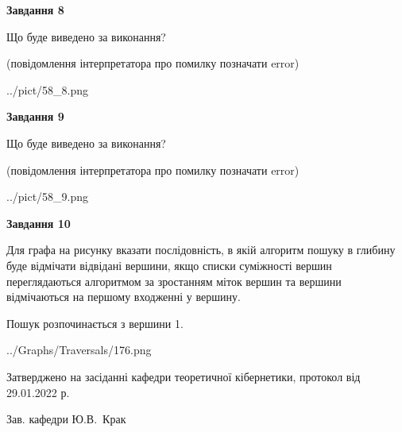 \documentclass[12pt, ukrainian]{article}
\begin{document}
{\begin {large}
{\begin {center}\textbf{Завдання 8}\end {center}}\par
Що буде виведено за виконання?\par
 (повідомлення інтерпретатора про помилку позначати error)
\begin{center}
	{../pict/58_8.png}
\end{center}
\newpage

{\begin {center}\textbf{Завдання 9}\end {center}}\par
Що буде виведено за виконання?\par
 (повідомлення інтерпретатора про помилку позначати error)\par
\begin{center}
	{../pict/58_9.png}
\end{center}
\newpage

{\begin {center}\textbf{Завдання 10}\end {center}}\par
Для графа на рисунку вказати послідовність, в якій алгоритм пошуку в глибину буде відмічати відвідані вершини, якщо списки суміжності вершин переглядаються алгоритмом за зростанням міток вершин та вершини відмічаються на першому вход\-женні у вершину.\par
Пошук розпочинається з вершини 1.\par

\begin{center}
	{../Graphs/Traversals/176.png}
\end{center}\par
\newpage


\end {large}
}
{\smallskip \begin {small} Затверджено на засіданні кафедри теоретичної кібернетики, протокол  від   29.01.2022 р.\par\smallskip\smallskip
{\parbox {6.5 cm}{Зав. кафедри \dotfill Ю.В.~Крак}} \end{small}}
\end{document}
